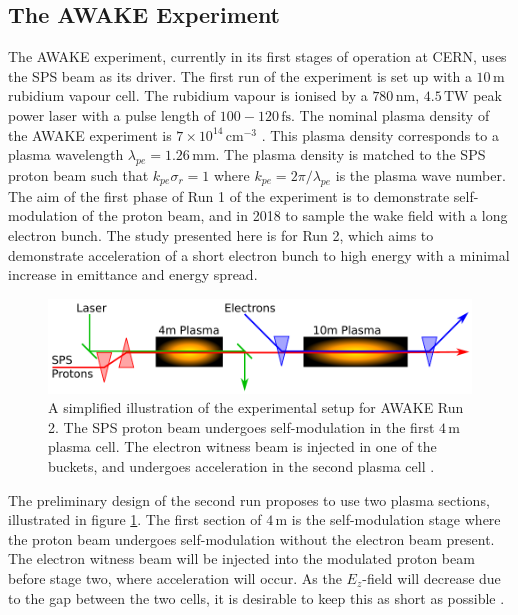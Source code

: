 \documentclass[aps,prstab,reprint,amsmath,amssymb,groupedaddress]{revtex4-1}
\newcommand{\unit}[1]{\,\mathrm{#1}}
\newcommand{\nexp}[1]{\times 10^{#1}}
\begin{document}
\subsection[\label{S:I:AWAKE}]{The AWAKE Experiment}

The AWAKE experiment, currently in its first stages of operation at CERN, uses the SPS beam as its driver. The first run
of the experiment is set up with a $10\unit{m}$ rubidium vapour cell. The rubidium vapour is ionised by a
$780\unit{nm}$, $4.5\unit{TW}$ peak power laser with a pulse length of $100−120\unit{fs}$. The nominal plasma density of
the AWAKE experiment is $7\nexp{14}\unit{cm}^{-3}$ \cite{gschwendtner:2016}. This plasma density corresponds to a plasma
wavelength $\lambda_{pe} = 1.26\unit{mm}$. The plasma density is matched to the SPS proton beam such that
$k_{pe}\sigma_{r} = 1$ where $k_{pe} = 2\pi/\lambda_{pe}$ is the plasma wave number. The aim of the first phase of Run 1
of the experiment is to demonstrate self-modulation of the proton beam, and in 2018 to sample the wake field with a long
electron bunch. The study presented here is for Run 2, which aims to demonstrate acceleration of a short electron bunch
to high energy with a minimal increase in emittance and energy spread.

\begin{figure}[hbt]
    \includegraphics[width=0.99\linewidth,trim={1mm 2mm 1mm 2mm},clip]{figures/figAWAKE}
    \caption{\label{Fig:AWAKER2} A simplified illustration of the experimental setup for AWAKE Run 2. The SPS proton
        beam undergoes self-modulation in the first $4\unit{m}$ plasma cell. The electron witness beam is injected in
        one of the buckets, and undergoes acceleration in the second plasma cell \cite{berglyd_olsen:2015, adli:2016}.}
\end{figure}

The preliminary design of the second run proposes to use two plasma sections, illustrated in figure \ref{Fig:AWAKER2}.
The first section of $4\unit{m}$ is the self-modulation stage where the proton beam undergoes self-modulation without
the electron beam present. The electron witness beam will be injected into the modulated proton beam before stage two,
where acceleration will occur. As the $E_z$-field will decrease due to the gap between the two cells, it is desirable to
keep this as short as possible \cite{adli:2016}.
\end{document}
